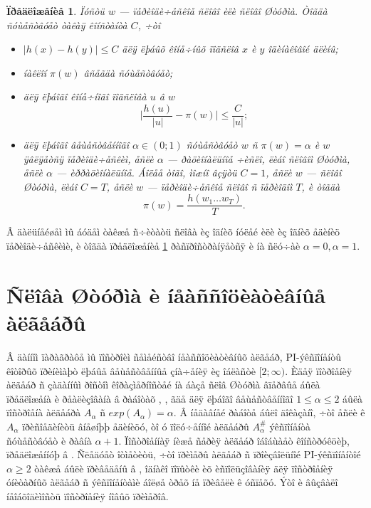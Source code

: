 \documentclass{article}
\numberwithin{equation}{section}
\theoremstyle{plain}
\newtheorem{propos}{Ïðåäëîæåíèå}
\theoremstyle{definition}
\begin{document}
\begin{fulltext}
\begin{propos}\label{p1}
Ïóñòü $w$ --- ïåðèîäè÷åñêîå ñëîâî èëè ñëîâî Øòóðìà. Òîãäà ñóùåñòâóåò òàêàÿ êîíñòàíòà $C$, ÷òî
\begin{itemize}
\item[(1)]
$|h(x)-h(y)| \le C$ äëÿ ëþáûõ êîíå÷íûõ ïîäñëîâ $x$ è $y$ îäèíàêîâîé äëèíû;
\item[(2)]
íàêëîí $\pi(w)$ âñåãäà ñóùåñòâóåò;
\item[(3)]
äëÿ ëþáîãî êîíå÷íîãî ïîäñëîâà $u$ â $w$
$$
\vert\frac{h(u)}{|u|} - \pi(w) \vert \le \frac{C}{|u|};
$$
\item[(4)]
äëÿ ëþáîãî âåùåñòâåííîãî $\alpha\in (0;1)$ ñóùåñòâóåò $w$ ñ $\pi(w)=\alpha$ è $w$ ÿâëÿåòñÿ
ïåðèîäè÷åñêèì, åñëè $\alpha$ --- ðàöèîíàëüíîå ÷èñëî, ëèáî ñëîâîì Øòóðìà, åñëè $\alpha$ ---
èððàöèîíàëüíîå. Áîëåå òîãî, ìîæíî âçÿòü $C=1$, åñëè $w$ --- ñëîâî Øòóðìà, ëèáî $C=T$, åñëè
$w$ --- ïåðèîäè÷åñêîå ñëîâî ñ ïåðèîäîì $T$, è òîãäà
$$
\pi(w)=\frac{h(w_1\ldots w_T)}{T}.
$$
\end{itemize}
\end{propos}

Â äàëüíåéøåì ìû áóäåì òàêæå ñ÷èòàòü ñëîâà èç îäíèõ íóëåé èëè èç îäíèõ åäèíèö ïåðèîäè÷åñêèìè,
è òîãäà ïðåäëîæåíèå \ref{p1} ðàñïðîñòðàíÿåòñÿ è íà ñëó÷àè $\alpha=0,\alpha=1$.

\section{Ñëîâà Øòóðìà è íåàññîöèàòèâíûå àëãåáðû}\label{s3}

Â äàííîì ïàðàãðàôå ìû ïîñòðîèì ñåìåéñòâî íåàññîöèàòèâíûõ àëãåáð, PI-ýêñïîíåíòû êîòîðûõ 
ïðèíèìàþò ëþáûå âåùåñòâåííûå çíà÷åíèÿ èç îáëàñòè $[2;\infty)$. Èäåÿ ïîòðîåíèÿ àëãåáð ñ 
çàäàííûì ðîñòîì êîðàçìåðíîñòåé íà áàçå ñëîâ Øòóðìà âïåðâûå áûëà ïðåäëîæåíà è ðåàëèçîâàíà 
â ðàáîòàõ \cite{GMZ0}, \cite{GMZ}, ãäå äëÿ ëþáîãî âåùåñòâåííîãî $1\le \alpha \le 2$ áûëà ïîñòðîåíà
àëãåáðà $A_\alpha$ ñ $exp(A_\alpha)=\alpha$. Â íåäàâíåé ðàáîòå \cite{RZ} áûëî äîêàçàíî,
÷òî åñëè ê $A_\alpha$ ïðèñîåäèíèòü âíåøíþþ åäèíèöó, òî ó ïîëó÷åííîé àëãåáðû 
$A_\alpha^\#$ ýêñïîíåíòà ñóùåñòâóåò è ðàâíà $\alpha+1$. Ïîñòðîåííàÿ íèæå ñåðèÿ
àëãåáð îáîáùàåò êîíñòðóêöèþ, ïðåäëîæåííóþ â \cite{GMZ}. Ñëåäóåò îòìåòèòü, ÷òî ïðèìåðû àëãåáð
ñ ïðîèçâîëüíîé PI-ýêñïîíåíòîé $\alpha\ge 2$ òàêæå áûëè ïðèâåäåíû â \cite{GMZ}, îäíàêî
ïîïûòêè èõ èñïîëüçîâàíèÿ äëÿ ïîñòðîåíèÿ óíèòàðíûõ àëãåáð ñ ýêñïîíåíòàìè áîëøå òðåõ íå
ïðèâåëè ê óñïåõó. Ýòî è âûçâàëî íåîáõîäèìîñòü ïîñòðîåíèÿ íîâûõ ïðèìåðîâ.


\end{fulltext}
\end{document}
